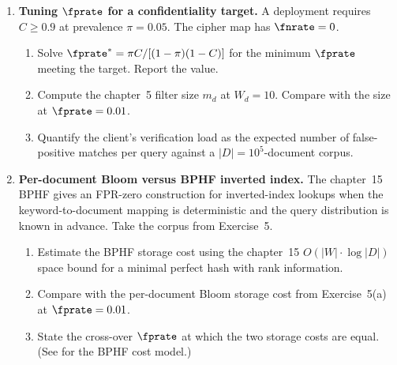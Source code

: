 \begin{enumerate}

\item \exstarstarstar
\label{ex:ch18-9}
\textbf{Tuning $\fprate$ for a confidentiality target.}
A deployment requires $C \ge 0.9$ at prevalence $\pi = 0.05$.
The cipher map has $\fnrate = 0$.
\begin{enumerate}
  \item[(a)] Solve $\fprate^* = \pi C / [(1 - \pi)(1 - C)]$
    for the minimum $\fprate$ meeting the target. Report the
    value.
  \item[(b)] Compute the chapter~5 filter size $m_d$ at
    $W_d = 10$. Compare with the size at $\fprate = 0.01$.
  \item[(c)] Quantify the client's verification load as the
    expected number of false-positive matches per query
    against a $|D| = 10^5$-document corpus.
\end{enumerate}

\item \exstarstarstar
\label{ex:ch18-10}
\textbf{Per-document Bloom versus BPHF inverted index.}
The chapter~15 BPHF gives an FPR-zero construction for
inverted-index lookups when the keyword-to-document mapping is
deterministic and the query distribution is known in advance.
Take the corpus from Exercise~5.
\begin{enumerate}
  \item[(a)] Estimate the BPHF storage cost using the
    chapter~15 $O(|W| \cdot \log |D|)$ space bound for a
    minimal perfect hash with rank information.
  \item[(b)] Compare with the per-document Bloom storage cost
    from Exercise~5(a) at $\fprate = 0.01$.
  \item[(c)] State the cross-over $\fprate$ at which the two
    storage costs are equal. (See
     for the BPHF cost model.)
\end{enumerate}


\end{enumerate}
